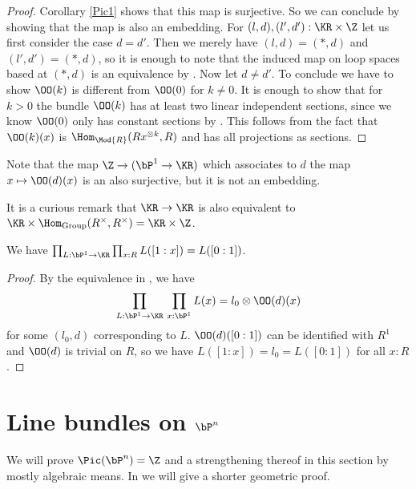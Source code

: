 \begin{proof}
  Corollary \ref{Pic1} shows that this map is surjective.
  So we can conclude by showing that the map is also an embedding.
  For $(l,d),(l',d'):\KR\times\Z$ let us first consider the case $d=d'$. 
  Then we merely have $(l,d)=(\ast,d)$ and $(l',d')=(\ast,d)$,
  so it is enough to note that the induced map on loop spaces based at $(\ast,d)$ is an equivalence by .
  Now let $d\neq d'$. To conclude we have to show $\OO(k)$ is different from $\OO(0)$ for $k\neq 0$.
  It is enough to show that for $k>0$ the bundle $\OO(k)$ has at least two linear independent sections,
  since we know $\OO(0)$ only has constant sections by .
  This follows from the fact that $\OO(k)(x)$ is $\Hom_{\Mod{R}}(Rx^{\otimes k},R)$ and has all projections as sections.
\end{proof}

Note that the map $\Z\rightarrow (\bP^1\rightarrow \KR)$ which
associates to $d$ the map $x\mapsto \OO(d)(x)$ is an also surjective, but it is not an embedding.

 It is a curious remark that $\KR\rightarrow \KR$ is also equivalent
 to $\KR\times \Hom_{\mathrm{Group}}(R^\times,R^\times) = \KR\times\Z$.

\begin{corollary}\label{Matthias1}
  We have $\prod_{L:\bP^1\rightarrow \KR}\prod_{x:R}L([1:x]) = L([0:1])$.
\end{corollary}

\begin{proof}
  By the equivalence in , we have
  \[ \prod_{L:\bP^1\to \KR} \,\prod_{x : \bP^1}  L(x)=l_0\otimes \OO(d)(x) \]
  for some $(l_0,d)$ corresponding to $L$.
  $\OO(d)([0:1])$ can be identified with $R^1$ and $\OO(d)$ is trivial on $R$,
  so we have $L([1:x])=l_0=L([0:1])$ for all $x:R$.
\end{proof}

\section{Line bundles on $\bP^n$}
We will prove $\Pic(\bP^n)=\Z$ and a strengthening thereof in this section by mostly algebraic means.
In  we will give a shorter geometric proof.

